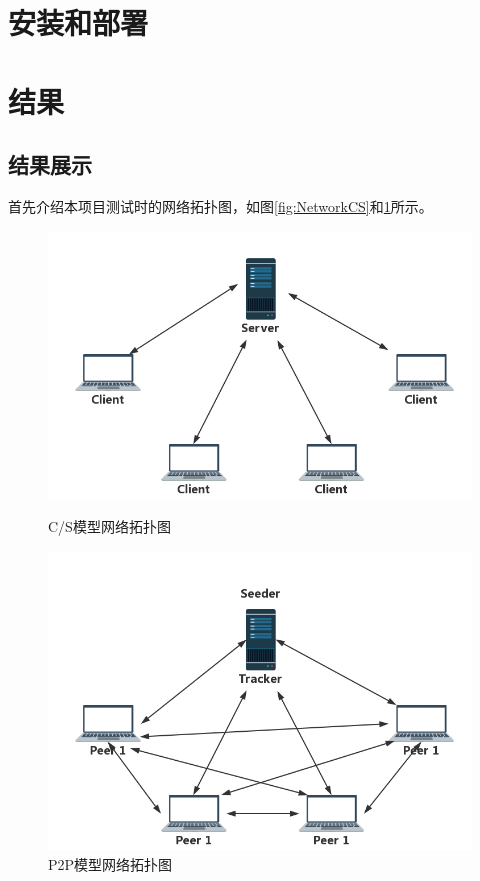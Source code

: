 \documentclass[15pt]{ctexart}
\begin{document}


\section{安装和部署} %
\label{sec:安装和部署}


\section{结果} %
\label{sec:结果}
\subsection{结果展示} %
\label{sub:结果展示}
首先介绍本项目测试时的网络拓扑图，如图\ref{fig:NetworkCS}和\ref{fig:NetworkP2P}所示。
\begin{figure}[H]
\begin{minipage}{0.48\linewidth}
	\centering
	\includegraphics[width=0.9\linewidth]{imgs/NetworkCS.png}
	\caption{C/S模型网络拓扑图}
	\label{fig:NetworkCS}
	\end{minipage}
	\centering
	\begin{minipage}{0.48\linewidth}
	\includegraphics[width=0.9\linewidth]{imgs/NetworkP2P.png}
	\caption{P2P模型网络拓扑图}
	\label{fig:NetworkP2P}
	\end{minipage}
\end{figure}
\end{document}
